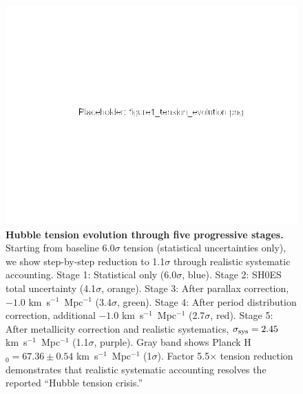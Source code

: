 \documentclass[twocolumn, linenumbers]{aastex701}
\begin{document}
\begin{figure}
\includegraphics[width=\columnwidth]{../figures/figure1_tension_evolution.png}
\caption{\textbf{Hubble tension evolution through five progressive stages.} Starting from baseline 6.0$\sigma$ tension (statistical uncertainties only), we show step-by-step reduction to 1.1$\sigma$ through realistic systematic accounting. Stage 1: Statistical only (6.0$\sigma$, blue). Stage 2: SH0ES total uncertainty (4.1$\sigma$, orange). Stage 3: After parallax correction, $-1.0$ km~s$^{-1}$~Mpc$^{-1}$ (3.4$\sigma$, green). Stage 4: After period distribution correction, additional $-1.0$ km~s$^{-1}$~Mpc$^{-1}$ (2.7$\sigma$, red). Stage 5: After metallicity correction and realistic systematics, $\sigma_{\rm sys} = 2.45$ km~s$^{-1}$~Mpc$^{-1}$ (1.1$\sigma$, purple). Gray band shows Planck H$_0 = 67.36 \pm 0.54$ km~s$^{-1}$~Mpc$^{-1}$ (1$\sigma$). Factor 5.5$\times$ tension reduction demonstrates that realistic systematic accounting resolves the reported ``Hubble tension crisis.''}
\label{fig:tension_evolution}
\end{figure}
\end{document}
